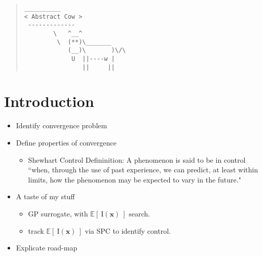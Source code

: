 \documentclass[12pt]{article}
\newcommand{\includemovie}[2][]{
    \includemedia[
        #1,
        activate=pageopen,transparent,
        addresource=#2.mp4,addresource=#2.png,
        flashvars={
            file=#2.mp4&image=#2.png&
            stretching=uniform&start=0&
            screencolor=white& %
            controlbar.position=over&controlbar.idlehide=true&
            autostart=true&repeat=always&smoothing=true
        }
    ]{ %
        \begin{tabular}{ll}
            \mbox{
                \textattachfile[color={0 0 0}]{#2.mp4} %
                {\texttt{|\kern-.23em>}} %
            } & \raisebox{-\height}{\texttt{[image: \#2]}}
        \end{tabular}
    }{player.swf}
}
\def \EIx {
	\mathbb{E}\left[~\text{I}(\bm{x})~\right]
}
\begin{document}


\begin{abstract}
\begin{verbatim}
__________
< Abstract Cow >
 -------------
        \   ^__^
         \  (**)\_______
            (__)\       )\/\
             U  ||----w |
                ||     ||
\end{verbatim}
\end{abstract}





\section{Introduction}
	\begin{itemize}
	\item[\checkmark] Identify convergence problem
	\item[\checkmark] Define properties of convergence 
	\begin{itemize}
		\item Shewhart Control Defininition: A phenomenon is said to be in control ``when, through the use of past experience, we can predict, at least within limits, how the phenomenon may be expected to vary in the future."
	\end{itemize}
	\item A taste of my stuff
	\begin{itemize}
		\item GP surrogate, with $\EIx$ search.
		\item track $\EIx$ via SPC to identify control.
	\end{itemize}
	\item[\checkmark] Explicate road-map
	\end{itemize}
\end{document}
